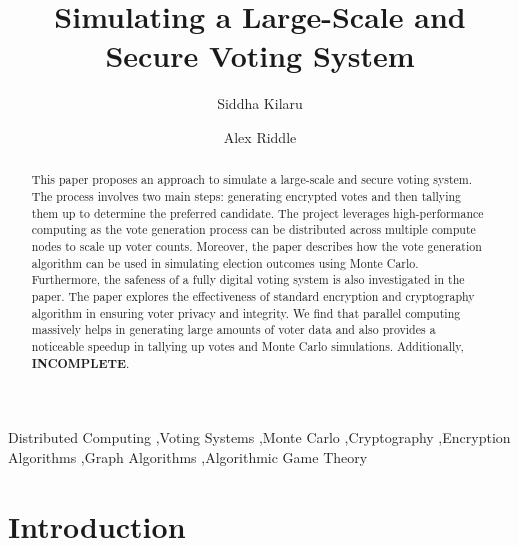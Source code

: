\documentclass[final,5p,times,twocolumn,authoryear, 10pt]{elsarticle}
\begin{document}
\begin{frontmatter}

\title{Simulating a Large-Scale and Secure Voting System}


\author{Siddha Kilaru}
\author{Alex Riddle}

\address{Rensselaer Polytechnic Institute, Troy, NY}


\begin{abstract}
This paper proposes an approach to simulate a large-scale and secure voting
system. The process involves two main steps: generating encrypted votes and
then tallying them up to determine the preferred candidate. The project
leverages high-performance computing as the vote generation process can be
distributed across multiple compute nodes to scale up voter counts. Moreover,
the paper describes how the vote generation algorithm can be used in simulating
election outcomes using Monte Carlo. Furthermore, the safeness of a fully
digital voting system is also investigated in the paper. The paper explores the
effectiveness of standard encryption and cryptography algorithm in ensuring
voter privacy and integrity. We find that parallel computing massively helps in
generating large amounts of voter data and also provides a noticeable speedup
in tallying up votes and Monte Carlo simulations. Additionally,
\textbf{INCOMPLETE}.


\end{abstract}

\begin{keyword}
Distributed Computing \sep Voting Systems \sep Monte Carlo \sep Cryptography
\sep Encryption Algorithms \sep Graph Algorithms \sep Algorithmic Game Theory



\end{keyword}


\end{frontmatter}
{ \hypersetup{hidelinks} \tableofcontents}


\section{Introduction}
\label{introduction}
\end{document}
